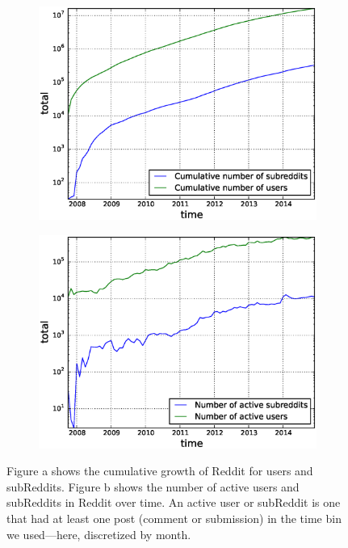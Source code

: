 \begin{figure}[!tb]
\centering
\begin{subfigure}{.49\textwidth}\includegraphics[scale=0.4]{./images/cumulative_users_subReddits.eps}\caption{}\end{subfigure}
\begin{subfigure}{.49\textwidth}\includegraphics[scale=0.4]{./images/active_users_subReddits.eps}\caption{}\end{subfigure}
\caption{Figure a shows the cumulative growth of Reddit for users and subReddits. Figure b shows the number of active users and subReddits in Reddit over time. An active user or subReddit is one that had at least one post (comment or submission) in the time bin we used---here, discretized by month.}
\label{fig:cumulative}
\end{figure}

